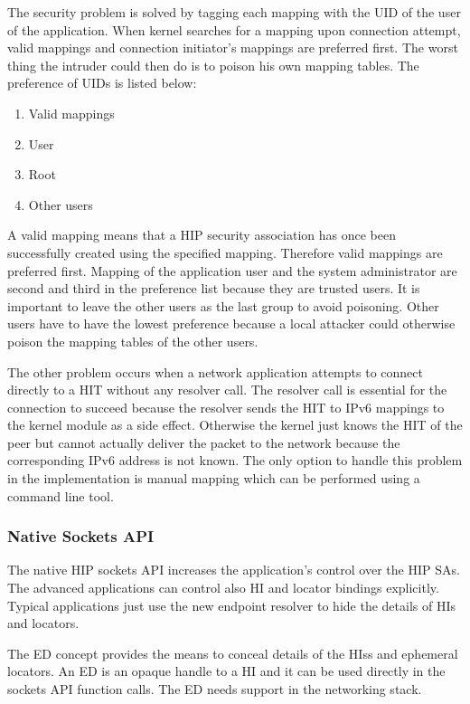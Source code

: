 The security problem is solved by tagging each mapping with the
\ac{UID} of the user of the application. When kernel searches for a
mapping upon connection attempt, valid mappings and connection
initiator's mappings are preferred first. The worst thing the intruder
could then do is to poison his own mapping tables. The preference of
\acp{UID} is listed below:

\begin{enumerate}
\item Valid mappings
\item User
\item Root
\item Other users
\end{enumerate}

A valid mapping means that a \ac{HIP} security association has once
been successfully created using the specified mapping. Therefore valid
mappings are preferred first. Mapping of the application user and the
system administrator are second and third in the preference list
because they are trusted users. It is important to leave the other
users as the last group to avoid poisoning. Other users have to have
the lowest preference because a local attacker could otherwise poison
the mapping tables of the other users.

The other problem occurs when a network application attempts to
connect directly to a \ac{HIT} without any resolver call. The resolver
call is essential for the connection to succeed because the resolver
sends the \ac{HIT} to IPv6 mappings to the kernel module as a side
effect. Otherwise the kernel just knows the \ac{HIT} of the peer but
cannot actually deliver the packet to the network because the
corresponding IPv6 address is not known. The only option to handle
this problem in the implementation is manual mapping which can be
performed using a command line tool.

\subsubsection{Native Sockets API}
\label{sec:native_api_architecture}

The native HIP sockets API increases the application's control over
the HIP \acp{SA}. The advanced applications can control also \ac{HI}
and locator bindings explicitly. Typical applications just use the new
endpoint resolver to hide the details of \acp{HI} and locators.

The \ac{ED} concept provides the means to conceal details of the
\acp{HI}s and ephemeral locators. An \ac{ED} is an opaque handle to a
\ac{HI} and it can be used directly in the sockets API function
calls. The ED needs support in the networking stack.

